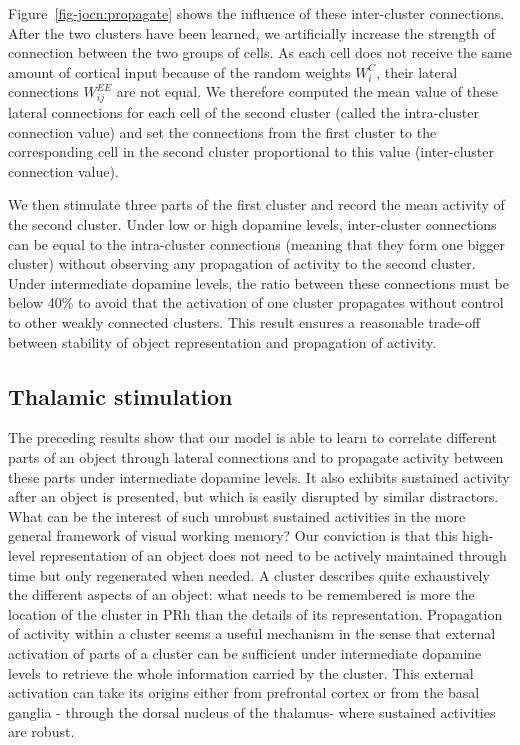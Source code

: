 \documentclass[
  11pt,
  a4paper,
]{scrbook}
\begin{document}
Figure~\ref{fig-jocn:propagate} shows the influence of these
inter-cluster connections. After the two clusters have been learned, we
artificially increase the strength of connection between the two groups
of cells. As each cell does not receive the same amount of cortical
input because of the random weights \(W^C_i\), their lateral connections
\(W^{EE}_{i j}\) are not equal. We therefore computed the mean value of
these lateral connections for each cell of the second cluster (called
the intra-cluster connection value) and set the connections from the
first cluster to the corresponding cell in the second cluster
proportional to this value (inter-cluster connection value).

We then stimulate three parts of the first cluster and record the mean
activity of the second cluster. Under low or high dopamine levels,
inter-cluster connections can be equal to the intra-cluster connections
(meaning that they form one bigger cluster) without observing any
propagation of activity to the second cluster. Under intermediate
dopamine levels, the ratio between these connections must be below 40\%
to avoid that the activation of one cluster propagates without control
to other weakly connected clusters. This result ensures a reasonable
trade-off between stability of object representation and propagation of
activity.

\subsection{Thalamic stimulation}\label{thalamic-stimulation}

The preceding results show that our model is able to learn to correlate
different parts of an object through lateral connections and to
propagate activity between these parts under intermediate dopamine
levels. It also exhibits sustained activity after an object is
presented, but which is easily disrupted by similar distractors. What
can be the interest of such unrobust sustained activities in the more
general framework of visual working memory? Our conviction is that this
high-level representation of an object does not need to be actively
maintained through time but only regenerated when needed. A cluster
describes quite exhaustively the different aspects of an object: what
needs to be remembered is more the location of the cluster in PRh than
the details of its representation. Propagation of activity within a
cluster seems a useful mechanism in the sense that external activation
of parts of a cluster can be sufficient under intermediate dopamine
levels to retrieve the whole information carried by the cluster. This
external activation can take its origins either from prefrontal cortex
or from the basal ganglia - through the dorsal nucleus of the thalamus-
where sustained activities are robust.
\end{document}
